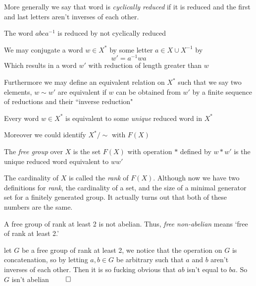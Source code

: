More generally we say that word is \textit{cyclically reduced} if it is reduced and the first and last letters aren't inverses of each other.
\begin{example}
    The word $abca^{-1}$ is reduced by not cyclically reduced
\end{example}
\begin{definition}[Conjugation]
    We may conjugate a word $w\in X^*$ by some letter $a\in X\cup X^{-1}$ by
    \[ w'=a^{-1}wa\]
    Which results in a word $w'$ with reduction of length greater than $w$
\end{definition}
Furthermore we may define an equivalent relation on $X^*$ such that we say two elements, $w\sim w'$ are equivalent if $w$ can be obtained from $w'$ by a finite sequence of reductions and their ``inverse reduction"
\begin{proposition}
    Every word $w\in X^*$ is equivalent to some \textit{unique} reduced word in $X^*$
\end{proposition}
Moreover we could identify $X^*/\sim$ with $F(X)$
\begin{definition}
    The \textit{free group} over $X$ is the set $F(X)$ with operation $*$ defined by $w*w'$ is the unique reduced word equivalent to $ww'$
\end{definition}
The cardinality of $X$ is called the \textit{rank} of $F(X)$. Although now we have two definitions for \textit{rank}, the cardinality of a set, and the size of a minimal generator set for a finitely generated group. It actually turns out that both of these numbers are the same.
\begin{exercise}
    A free group of rank at least 2 is not abelian. Thus, \textit{free non-abelian} means ‘free of rank at least 2.’
\end{exercise}
let $G$ be a free group of rank at least 2, we notice that the operation on $G$ is concatenation, so by letting $a,b\in G$ be arbitrary such that $a$ and $b$ aren't inverses of each other. Then it is so fucking obvious that $ab$ isn't equal to $ba$. So $G$ isn't abelian $\qed$
\BBreak
